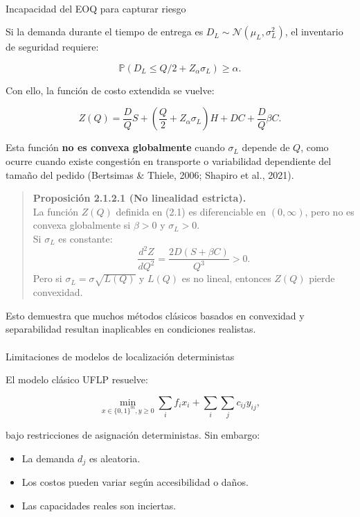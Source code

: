 \documentclass[
  spanish,
  letterpaper,
  DIV=11,
  numbers=noendperiod]{scrartcl}
\makeatletter
\let\oldparagraph\paragraph
\renewcommand{\paragraph}{
    \@ifstar
      \xxxParagraphStar
      \xxxParagraphNoStar
  }
\newcommand{\xxxParagraphStar}[1]{\oldparagraph*{#1}\mbox{}}
\newcommand{\xxxParagraphNoStar}[1]{\oldparagraph{#1}\mbox{}}
\providecommand{\tightlist}{%
  \setlength{\itemsep}{0pt}\setlength{\parskip}{0pt}}
\makeatother
\begin{document}
\paragraph{Incapacidad del EOQ para capturar
riesgo}\label{incapacidad-del-eoq-para-capturar-riesgo}

Si la demanda durante el tiempo de entrega es
\(D_L\sim\mathcal{N}(\mu_L,\sigma_L^2)\), el inventario de seguridad
requiere:

\[
\mathbb{P}(D_L\leq Q/2 + Z_\alpha\sigma_L)\geq \alpha.
\]

Con ello, la función de costo extendida se vuelve:

\[
Z(Q)=\frac{D}{Q}S+\left(\frac{Q}{2}+Z_\alpha\sigma_L\right)H+DC+\frac{D}{Q}\beta C. \tag{2.1}
\]

Esta función \textbf{no es convexa globalmente} cuando \(\sigma_L\)
depende de \(Q\), como ocurre cuando existe congestión en transporte o
variabilidad dependiente del tamaño del pedido (Bertsimas \& Thiele,
2006; Shapiro et al., 2021).

\begin{quote}
\textbf{Proposición 2.1.2.1 (No linealidad estricta).}\\
La función \(Z(Q)\) definida en (2.1) es diferenciable en
\((0,\infty)\), pero no es convexa globalmente si \(\beta>0\) y
\(\sigma_L>0\).\\
Si \(\sigma_L\) es constante: \[
\frac{d^2 Z}{dQ^2}=\frac{2D(S+\beta C)}{Q^3}>0.
\] Pero si \(\sigma_L=\sigma\sqrt{L(Q)}\) y \(L(Q)\) es no lineal,
entonces \(Z(Q)\) pierde convexidad.
\end{quote}

Esto demuestra que muchos métodos clásicos basados en convexidad y
separabilidad resultan inaplicables en condiciones realistas.

\paragraph{Limitaciones de modelos de localización
deterministas}\label{limitaciones-de-modelos-de-localizaciuxf3n-deterministas}

El modelo clásico UFLP resuelve:

\[
\min_{x\in\{0,1\}^m, y\ge 0}\sum_{i}f_i x_i + \sum_{i}\sum_j c_{ij}y_{ij},
\]

bajo restricciones de asignación deterministas. Sin embargo:

\begin{itemize}
\tightlist
\item
  La demanda \(d_j\) es aleatoria.
\item
  Los costos pueden variar según accesibilidad o daños.
\item
  Las capacidades reales son inciertas.
\end{itemize}
\end{document}
